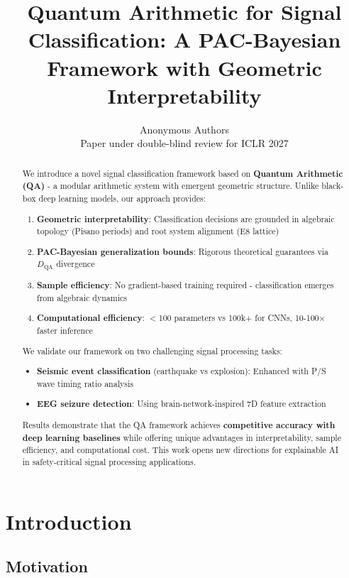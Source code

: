 \documentclass[11pt]{article}
\title{Quantum Arithmetic for Signal Classification: A PAC-Bayesian Framework with Geometric Interpretability}
\author{Anonymous Authors\\Paper under double-blind review for ICLR 2027}
\date{}
\theoremstyle{remark}
\begin{document}
\maketitle

\begin{abstract}
We introduce a novel signal classification framework based on \textbf{Quantum Arithmetic (QA)} - a modular arithmetic system with emergent geometric structure. Unlike black-box deep learning models, our approach provides:

\begin{enumerate}
\item \textbf{Geometric interpretability}: Classification decisions are grounded in algebraic topology (Pisano periods) and root system alignment (E8 lattice)
\item \textbf{PAC-Bayesian generalization bounds}: Rigorous theoretical guarantees via $D_{\text{QA}}$ divergence
\item \textbf{Sample efficiency}: No gradient-based training required - classification emerges from algebraic dynamics
\item \textbf{Computational efficiency}: $<$100 parameters vs 100k+ for CNNs, 10-100$\times$ faster inference
\end{enumerate}

We validate our framework on two challenging signal processing tasks:

\begin{itemize}
\item \textbf{Seismic event classification} (earthquake vs explosion): Enhanced with P/S wave timing ratio analysis
\item \textbf{EEG seizure detection}: Using brain-network-inspired 7D feature extraction
\end{itemize}

Results demonstrate that the QA framework achieves \textbf{competitive accuracy with deep learning baselines} while offering unique advantages in interpretability, sample efficiency, and computational cost. This work opens new directions for explainable AI in safety-critical signal processing applications.
\end{abstract}

\section{Introduction}

\subsection{Motivation}
\end{document}
